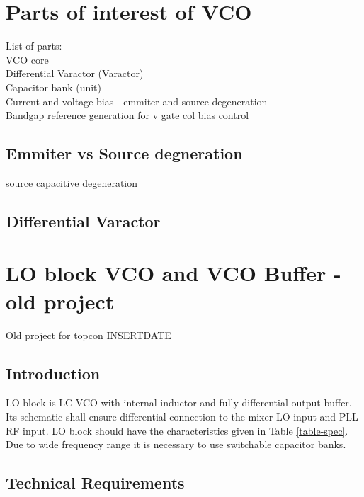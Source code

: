 \documentclass{article}
\begin{document}
\section{Parts of interest of VCO}

List of parts:
\\
VCO core
\\
Differential Varactor (Varactor)
\\
Capacitor bank (unit)
\\
Current and voltage bias - emmiter and source degeneration
\\
Bandgap reference generation for v gate col bias control 

\subsection{Emmiter vs Source degneration}

source capacitive degeneration


\subsection{Differential Varactor}
%

\newpage

\section{LO block VCO and VCO Buffer - old project}

Old project for topcon INSERTDATE %

\subsection{Introduction} %

LO block is LC VCO with internal inductor and fully differential output buffer. Its schematic shall ensure differential connection to the mixer LO input and PLL RF input. LO block should have the characteristics given in Table \ref{table-spec}. Due to wide frequency range it is necessary to use switchable capacitor banks.  

\subsection{Technical Requirements}
\end{document}
